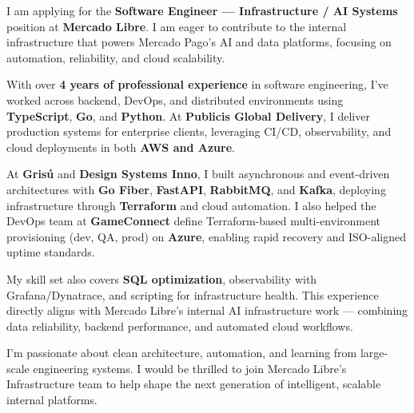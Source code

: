 \documentclass[11pt,a4paper]{awesome-cv}
\begin{document}
\makecvheader[R]
\makelettertitle

\begin{cvletter}

I am applying for the \textbf{Software Engineer — Infrastructure / AI Systems} position at \textbf{Mercado Libre}. I am eager to contribute to the internal infrastructure that powers Mercado Pago’s AI and data platforms, focusing on automation, reliability, and cloud scalability.

With over \textbf{4 years of professional experience} in software engineering, I’ve worked across backend, DevOps, and distributed environments using \textbf{TypeScript}, \textbf{Go}, and \textbf{Python}. At \textbf{Publicis Global Delivery}, I deliver production systems for enterprise clients, leveraging CI/CD, observability, and cloud deployments in both \textbf{AWS and Azure}.  

At \textbf{Grisú} and \textbf{Design Systems Inno}, I built asynchronous and event-driven architectures with \textbf{Go Fiber}, \textbf{FastAPI}, \textbf{RabbitMQ}, and \textbf{Kafka}, deploying infrastructure through \textbf{Terraform} and cloud automation. I also helped the DevOps team at \textbf{GameConnect} define Terraform-based multi-environment provisioning (dev, QA, prod) on \textbf{Azure}, enabling rapid recovery and ISO-aligned uptime standards.  

My skill set also covers \textbf{SQL optimization}, observability with Grafana/Dynatrace, and scripting for infrastructure health. This experience directly aligns with Mercado Libre’s internal AI infrastructure work — combining data reliability, backend performance, and automated cloud workflows.

I’m passionate about clean architecture, automation, and learning from large-scale engineering systems. I would be thrilled to join Mercado Libre’s Infrastructure team to help shape the next generation of intelligent, scalable internal platforms.

\end{cvletter}

\makeletterclosing
\end{document}
